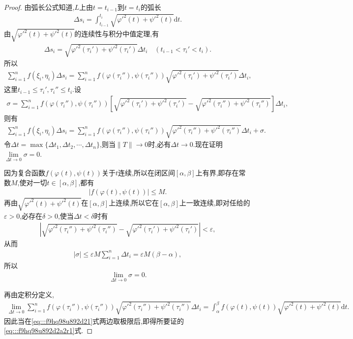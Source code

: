 \documentclass[../../main.tex]{subfiles}%
\begin{document}
\begin{proof}

由弧长公式知道,$L$上由$t=t_{i-1}$到$t=t_i$的弧长
\begin{align*}
\Delta s_i = \int_{t_{i-1}}^{t_i} \sqrt{\varphi'^2(t) + \psi'^2(t)} \mathrm{d}t.
\end{align*}
由$\sqrt{\varphi'^2(t)+\psi'^2(t)}$的连续性与积分中值定理,有
\begin{align*}
\Delta s_i = \sqrt{\varphi'^2(\tau_i') + \psi'^2(\tau_i')} \Delta t_i \quad (t_{i-1} < \tau_i' < t_i).
\end{align*}
所以
\begin{align*}
\sum_{i=1}^n f(\xi_i,\eta_i) \Delta s_i = \sum_{i=1}^n f(\varphi(\tau_i''),\psi(\tau_i'')) \sqrt{\varphi'^2(\tau_i') + \psi'^2(\tau_i')} \Delta t_i,
\end{align*}
这里$t_{i-1} \leqslant \tau_i',\tau_i'' \leqslant t_i$.设
\begin{align*}
\sigma = \sum_{i=1}^n f(\varphi(\tau_i''),\psi(\tau_i'')) \left[ \sqrt{\varphi'^2(\tau_i') + \psi'^2(\tau_i')} - \sqrt{\varphi'^2(\tau_i'') + \psi'^2(\tau_i'')} \right] \Delta t_i,
\end{align*}
则有
\begin{align}
\sum_{i=1}^n f(\xi_i,\eta_i) \Delta s_i = \sum_{i=1}^n f(\varphi(\tau_i''),\psi(\tau_i'')) \sqrt{\varphi'^2(\tau_i'') + \psi'^2(\tau_i'')} \Delta t_i + \sigma. \label{eq:::f9hq98u892d21}
\end{align}
令$\Delta t = \max\{ \Delta t_1,\Delta t_2,\cdots,\Delta t_n \}$,则当$\| T \| \to 0$时,必有$\Delta t \to 0$.现在证明$\lim\limits_{\Delta t \to 0} \sigma = 0$.

因为复合函数$f(\varphi(t),\psi(t))$关于$t$连续,所以在闭区间$[\alpha,\beta]$上有界,即存在常数$M$,使对一切$t \in [\alpha,\beta]$,都有
\begin{align*}
|f(\varphi(t),\psi(t))| \leqslant M.
\end{align*}
再由$\sqrt{\varphi'^2(t)+\psi'^2(t)}$在$[\alpha,\beta]$上连续,所以它在$[\alpha,\beta]$上一致连续,即对任给的$\varepsilon > 0$,必存在$\delta > 0$,使当$\Delta t < \delta$时有
\begin{align*}
\left| \sqrt{\varphi'^2(\tau_i'') + \psi'^2(\tau_i'')} - \sqrt{\varphi'^2(\tau_i') + \psi'^2(\tau_i')} \right| < \varepsilon,
\end{align*}
从而
\begin{align*}
|\sigma| \leqslant \varepsilon M \sum_{i=1}^n \Delta t_i = \varepsilon M (\beta - \alpha),
\end{align*}
所以
\begin{align*}
\lim_{\Delta t \to 0} \sigma = 0.
\end{align*}

再由定积分定义,
\begin{align*}
\lim_{\Delta t \to 0} \sum_{i=1}^n f(\varphi(\tau_i''),\psi(\tau_i'')) \sqrt{\varphi'^2(\tau_i'') + \psi'^2(\tau_i'')} \Delta t_i
= \int_{\alpha}^{\beta} f(\varphi(t),\psi(t)) \sqrt{\varphi'^2(t) + \psi'^2(t)} \mathrm{d}t.
\end{align*}
因此当在\eqref{eq:::f9hq98u892d21}式两边取极限后,即得所要证的\eqref{eq:::f9hq98u892d2a2r1}式.

\end{proof}
\end{document}
